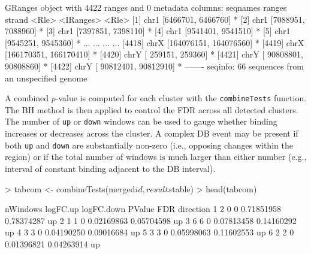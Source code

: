 \documentclass[12pt]{report}
\renewenvironment{Schunk}{\vspace{0pt}}{\vspace{0pt}}
\newcommand{\code}[1]{{\small\texttt{#1}}}
\begin{document}
\begin{Schunk}
\begin{Soutput}
GRanges object with 4422 ranges and 0 metadata columns:
         seqnames                 ranges strand
            <Rle>              <IRanges>  <Rle>
     [1]     chr1     [6466701, 6466760]      *
     [2]     chr1     [7088951, 7088960]      *
     [3]     chr1     [7397851, 7398110]      *
     [4]     chr1     [9541401, 9541510]      *
     [5]     chr1     [9545251, 9545360]      *
     ...      ...                    ...    ...
  [4418]     chrX [164076151, 164076560]      *
  [4419]     chrX [166170351, 166170410]      *
  [4420]     chrY [   259151,    259360]      *
  [4421]     chrY [ 90808801,  90808860]      *
  [4422]     chrY [ 90812401,  90812910]      *
  -------
  seqinfo: 66 sequences from an unspecified genome
\end{Soutput}
\end{Schunk}

A combined $p$-value is computed for each cluster with the \code{combineTests} function.
The BH method is then applied to control the FDR across all detected clusters.
The number of \code{up} or \code{down} windows can be used to gauge whether binding increases or decreases across the cluster.
A complex DB event may be present if both \code{up} and \code{down} are substantially non-zero (i.e., opposing changes within the region) or if the total number of windows is much larger than either number (e.g., interval of constant binding adjacent to the DB interval).

\begin{Schunk}
\begin{Sinput}
> tabcom <- combineTests(merged$id, results$table)
> head(tabcom)
\end{Sinput}
\begin{Soutput}
  nWindows logFC.up logFC.down     PValue        FDR direction
1        2        0          0 0.71851958 0.78374287        up
2        1        1          0 0.02169863 0.05704598        up
3        6        6          0 0.07813458 0.14160292        up
4        3        3          0 0.04190250 0.09016684        up
5        3        3          0 0.05998063 0.11602553        up
6        2        2          0 0.01396821 0.04263914        up
\end{Soutput}
\end{Schunk}
\end{document}

